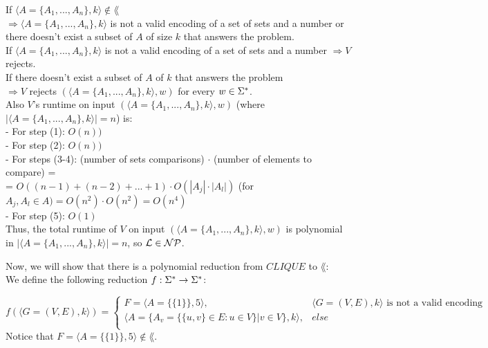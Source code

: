 If $\langle A = \{A_1, ..., A_n\}, k \rangle \notin \lang$ \\
$\Rightarrow \langle A = \{A_1, ..., A_n\}, k \rangle$ is not a valid encoding of a set of sets and a number
or there doesn't exist a subset of $A$ of size $k$ that answers the problem. \\
If $\langle A = \{A_1, ..., A_n\}, k \rangle$ is not a valid encoding of a set of sets and a number $\Rightarrow V$ rejects. \\
If there doesn't exist a subset of $A$ of $k$ that answers the problem \\
$\Rightarrow V$ rejects $(\langle A = \{A_1, ..., A_n\}, k \rangle, w)$ for every $w \in \Sigma^*$. \\

Also $V$'s runtime on input $(\langle A = \{A_1, ..., A_n\}, k \rangle, w)$
(where $|\langle A = \{A_1, ..., A_n\}, k \rangle|=n$) is: \\
- For step (1): $O(n))$  \\
- For step (2): $O(n))$  \\
- For steps (3-4): (number of sets comparisons) $\cdot$ (number of elements to compare) = \\
= $O((n-1)+(n-2)+...+1) \cdot O(|A_j| \cdot |A_l|)$ (for $A_j, A_l \in A) = O(n^2) \cdot O(n^2) = O(n^4)$ \\
- For step (5): $O(1)$ \\
Thus, the total runtime of $V$ on input  $(\langle A = \{A_1, ..., A_n\}, k \rangle, w)$ is polynomial \\
in $|\langle A = \{A_1, ..., A_n\}, k \rangle|=n$, so \underline{$\mathcal{L} \in \mathcal{N}\mathcal{P}$}. \\

\pagebreak

Now, we will show that there is a polynomial reduction from $CLIQUE$ to $\lang$: \\
We define the following reduction $f: \Sigma^* \rightarrow \Sigma^*$:

$
    f(\langle G=(V,E), k \rangle) =
    \begin{cases}
        F = \langle A=\{\{1\}\}, 5 \rangle,                                  & \langle G=(V,E), k \rangle \text{ is not a valid encoding } \\
        \langle A=\{A_v = \{\{u,v\} \in E: u \in V\} | v \in V\}, k \rangle, & else                                                        \\
    \end{cases}
$
Notice that $F = \langle A=\{\{1\}\}, 5 \rangle \notin \lang$. \\

